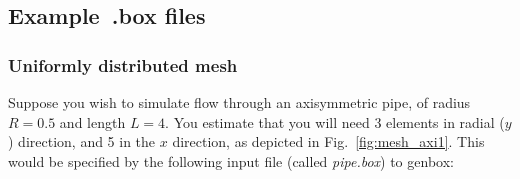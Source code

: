 

\subsection{Example~.box files}

\subsubsection{Uniformly distributed mesh}

Suppose you wish to simulate flow through an axisymmetric pipe, of radius
\(R=0.5\) and length \(L=4\).  You estimate that you will need 3 elements in
radial (\(y\)) direction, and 5 in the \(x\) direction, as depicted in
Fig.~\ref{fig:mesh_axi1}.  This would be specified by the following input file
(called {\em pipe.box}) to genbox:


